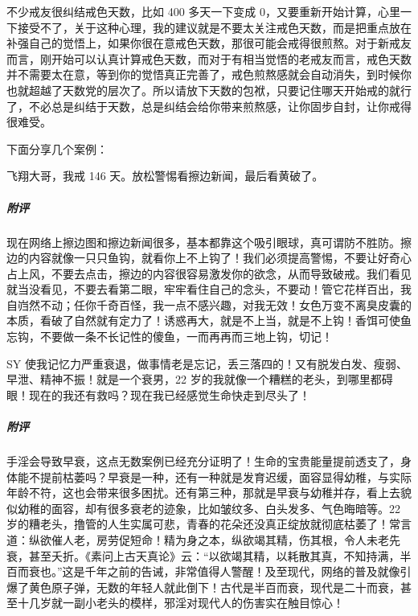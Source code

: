 不少戒友很纠结戒色天数，比如 400 多天一下变成 0，又要重新开始计算，心里一下接受不了，关于这种心理，我的建议就是不要太关注戒色天数，而是把重点放在补强自己的觉悟上，如果你很在意戒色天数，那很可能会戒得很煎熬。对于新戒友而言，刚开始可以认真计算戒色天数，而对于有相当觉悟的老戒友而言，戒色天数并不需要太在意，等到你的觉悟真正完善了，戒色煎熬感就会自动消失，到时候你也就超越了天数党的层次了。所以请放下天数的包袱，只要记住哪天开始戒的就行了，不必总是纠结于天数，总是纠结会给你带来煎熬感，让你固步自封，让你戒得很难受。

下面分享几个案例：

\begin{case}
    飞翔大哥，我戒 146 天。放松警惕看擦边新闻，最后看黄破了。
    \subparagraph{附评} 现在网络上擦边图和擦边新闻很多，基本都靠这个吸引眼球，真可谓防不胜防。擦边的内容就像一只只鱼钩，就看你上不上钩了！我们必须提高警惕，不要让好奇心占上风，不要去点击，擦边的内容很容易激发你的欲念，从而导致破戒。我们看见就当没看见，不要去看第二眼，牢牢看住自己的念头，不要动！管它花样百出，我自岿然不动；任你千奇百怪，我一点不感兴趣，对我无效！女色万变不离臭皮囊的本质，看破了自然就有定力了！诱惑再大，就是不上当，就是不上钩！香饵可使鱼忘钩，不要做一条不长记性的傻鱼，一而再再而三地上钩，切记！
\end{case}

\begin{case}
    SY 使我记忆力严重衰退，做事情老是忘记，丢三落四的！又有脱发白发、瘦弱、早泄、精神不振！就是一个衰男，22 岁的我就像一个糟糕的老头，到哪里都碍眼！现在的我还有救吗？现在我已经感觉生命快走到尽头了！
    \subparagraph{附评} 手淫会导致早衰，这点无数案例已经充分证明了！生命的宝贵能量提前透支了，身体能不提前枯萎吗？早衰是一种，还有一种就是发育迟缓，面容显得幼稚，与实际年龄不符，这也会带来很多困扰。还有第三种，那就是早衰与幼稚并存，看上去貌似幼稚的面容，却有很多衰老的迹象，比如皱纹多、白头发多、气色晦暗等。22 岁的糟老头，撸管的人生实属可悲，青春的花朵还没真正绽放就彻底枯萎了！常言道：纵欲催人老，房劳促短命！精为身之本，纵欲竭其精，伤其根，令人未老先衰，甚至夭折。《素问上古天真论》云：“以欲竭其精，以耗散其真，不知持满，半百而衰也。”这是千年之前的告诫，非常值得人警醒！及至现代，网络的普及就像引爆了黄色原子弹，无数的年轻人就此倒下！古代是半百而衰，现代是二十而衰，甚至十几岁就一副小老头的模样，邪淫对现代人的伤害实在触目惊心！
\end{case}

